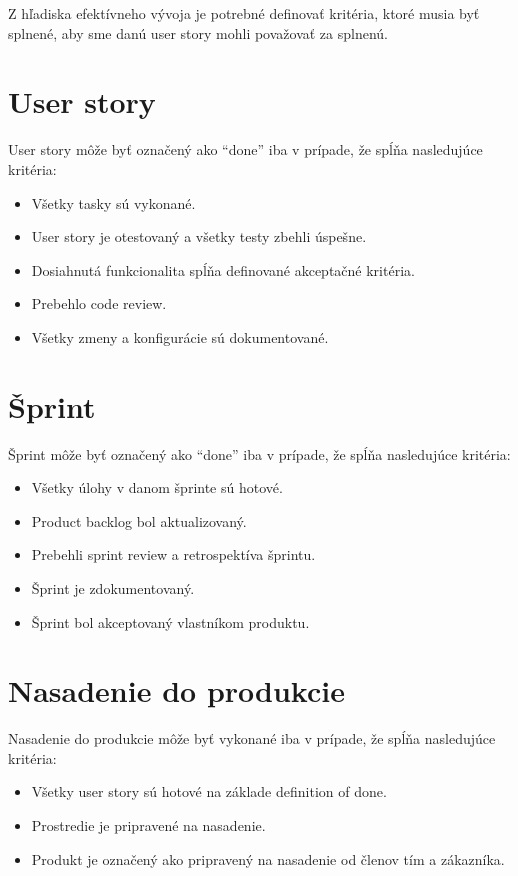 \documentclass{article}
\begin{document}
    

    \noindent \textnormal{Z hľadiska efektívneho vývoja je potrebné definovať kritéria, ktoré musia byť splnené, aby sme danú user story mohli považovať za splnenú.}

    \section*{User story}

    \textnormal{User story môže byť označený ako “done” iba v prípade, že spĺňa nasledujúce kritéria:}

    \begin{itemize}
        \item Všetky tasky sú vykonané.
        \item User story je otestovaný a všetky testy zbehli úspešne.
        \item Dosiahnutá funkcionalita spĺňa definované akceptačné kritéria.
        \item Prebehlo code review.
        \item Všetky zmeny a konfigurácie sú dokumentované.
    \end{itemize}

    \section*{Šprint}

    \textnormal{Šprint môže byť označený ako “done” iba v prípade, že spĺňa nasledujúce kritéria:}

    \begin{itemize}
        \item Všetky úlohy v danom šprinte sú hotové.
        \item Product backlog bol aktualizovaný.
        \item Prebehli sprint review a retrospektíva šprintu.
        \item Šprint je zdokumentovaný.
        \item Šprint bol akceptovaný vlastníkom produktu.
    \end{itemize}


    \section*{Nasadenie do produkcie}

    \textnormal{Nasadenie do produkcie môže byť vykonané iba v prípade, že spĺňa nasledujúce kritéria:}

    \begin{itemize}
        \item Všetky user story sú hotové na základe definition of done.
        \item Prostredie je pripravené na nasadenie.
        \item Produkt je označený ako pripravený na nasadenie od členov tím a zákazníka.
    \end{itemize}
\end{document}
